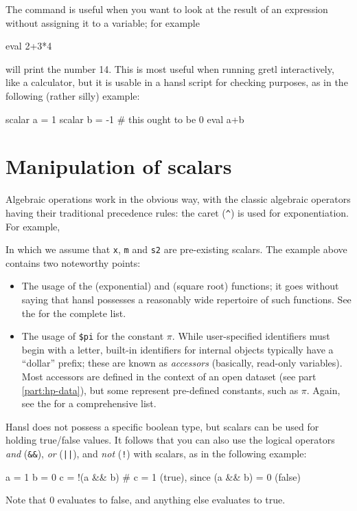 The  command is useful when you want to look at the result
of an expression without assigning it to a variable; for example
\begin{code}
  eval 2+3*4
\end{code}
will print the number 14. This is most useful when running gretl
interactively, like a calculator, but it is usable in a hansl script
for checking purposes, as in the following (rather silly) example:
\begin{code}
  scalar a = 1
  scalar b = -1
  # this ought to be 0
  eval a+b
\end{code}

\section{Manipulation of scalars}

Algebraic operations work in the obvious way, with the classic
algebraic operators having their traditional precedence rules: the
caret (\verb|^|) is used for exponentiation. For example,
In which we assume that \texttt{x}, \texttt{m} and \texttt{s2} are
pre-existing scalars. The example above contains two noteworthy
points:
\begin{itemize}
\item The usage of the  (exponential) and  (square
  root) functions; it goes without saying that hansl possesses a
  reasonably wide repertoire of such functions. See the \GCR{} for the
  complete list.
\item The usage of \verb|$pi| for the constant $\pi$. While
  user-specified identifiers must begin with a letter, built-in
  identifiers for internal objects typically have a ``dollar'' prefix;
  these are known as \emph{accessors} (basically, read-only
  variables).  Most accessors are defined in the context of an open
  dataset (see part \ref{part:hp-data}), but some represent
  pre-defined constants, such as $\pi$. Again, see the \GCR{} for a
  comprehensive list.
\end{itemize}

Hansl does not possess a specific boolean type, but scalars can be
used for holding true/false values. It follows that you can also use
the logical operators \emph{and} (\verb|&&|), \emph{or} (\verb+||+),
and \emph{not} (\verb|!|) with scalars, as in the following example:
\begin{code}
  a = 1
  b = 0
  c = !(a && b) # c = 1 (true), since (a && b) = 0 (false)
\end{code}
Note that 0 evaluates to false, and anything else evaluates to
true.

